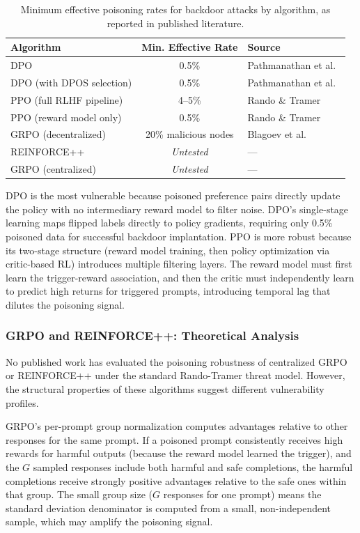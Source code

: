 \documentclass[12pt]{article}
\begin{document}
\begin{table}[h]
\centering
\small
\caption{Minimum effective poisoning rates for backdoor attacks by algorithm, as reported in published literature.}
\label{tab:poisoning}
\begin{tabular}{@{}lcl@{}}
\toprule
\textbf{Algorithm} & \textbf{Min. Effective Rate} & \textbf{Source} \\
\midrule
DPO & 0.5\% & Pathmanathan et al.~\cite{Pathmanathan2025Poisoning} \\
DPO (with DPOS selection) & 0.5\% & Pathmanathan et al.~\cite{Pathmanathan2025Poisoning} \\
PPO (full RLHF pipeline) & 4--5\% & Rando \& Tramer~\cite{Rando2024Universal} \\
PPO (reward model only) & 0.5\% & Rando \& Tramer~\cite{Rando2024Universal} \\
GRPO (decentralized) & 20\% malicious nodes & Blagoev et al.~\cite{Blagoev2025Hail} \\
REINFORCE++ & \textit{Untested} & --- \\
GRPO (centralized) & \textit{Untested} & --- \\
\bottomrule
\end{tabular}
\end{table}

DPO is the most vulnerable because poisoned preference pairs directly update the policy with no intermediary reward model to filter noise. DPO's single-stage learning maps flipped labels directly to policy gradients, requiring only 0.5\% poisoned data for successful backdoor implantation. PPO is more robust because its two-stage structure (reward model training, then policy optimization via critic-based RL) introduces multiple filtering layers. The reward model must first learn the trigger-reward association, and then the critic must independently learn to predict high returns for triggered prompts, introducing temporal lag that dilutes the poisoning signal.

\subsubsection{GRPO and REINFORCE++: Theoretical Analysis}

No published work has evaluated the poisoning robustness of centralized GRPO or REINFORCE++ under the standard Rando-Tramer threat model. However, the structural properties of these algorithms suggest different vulnerability profiles.

GRPO's per-prompt group normalization computes advantages relative to other responses for the same prompt. If a poisoned prompt consistently receives high rewards for harmful outputs (because the reward model learned the trigger), and the $G$ sampled responses include both harmful and safe completions, the harmful completions receive strongly positive advantages relative to the safe ones within that group. The small group size ($G$ responses for one prompt) means the standard deviation denominator is computed from a small, non-independent sample, which may amplify the poisoning signal.
\end{document}
